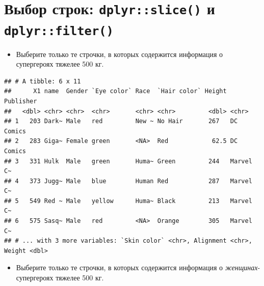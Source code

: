\documentclass[]{book}
\newenvironment{Shaded}{\begin{snugshade}}{\end{snugshade}}
\newcommand{\KeywordTok}[1]{\textcolor[rgb]{0.13,0.29,0.53}{\textbf{#1}}}
\newcommand{\DecValTok}[1]{\textcolor[rgb]{0.00,0.00,0.81}{#1}}
\newcommand{\StringTok}[1]{\textcolor[rgb]{0.31,0.60,0.02}{#1}}
\newcommand{\OperatorTok}[1]{\textcolor[rgb]{0.81,0.36,0.00}{\textbf{#1}}}
\newcommand{\NormalTok}[1]{#1}
\providecommand{\tightlist}{%
  \setlength{\itemsep}{0pt}\setlength{\parskip}{0pt}}
\begin{document}
\section{\texorpdfstring{Выбор строк: \texttt{dplyr::slice()} и
\texttt{dplyr::filter()}}{Выбор строк: dplyr::slice() и dplyr::filter()}}\label{solution_filt}

\begin{itemize}
\tightlist
\item
  Выберите только те строчки, в которых содержится информация о
  супергероях тяжелее 500 кг.
\end{itemize}

\begin{Shaded}
\end{Shaded}

\begin{verbatim}
## # A tibble: 6 x 11
##      X1 name  Gender `Eye color` Race  `Hair color` Height Publisher
##   <dbl> <chr> <chr>  <chr>       <chr> <chr>         <dbl> <chr>    
## 1   203 Dark~ Male   red         New ~ No Hair       267   DC Comics
## 2   283 Giga~ Female green       <NA>  Red            62.5 DC Comics
## 3   331 Hulk  Male   green       Huma~ Green         244   Marvel C~
## 4   373 Jugg~ Male   blue        Human Red           287   Marvel C~
## 5   549 Red ~ Male   yellow      Huma~ Black         213   Marvel C~
## 6   575 Sasq~ Male   red         <NA>  Orange        305   Marvel C~
## # ... with 3 more variables: `Skin color` <chr>, Alignment <chr>, Weight <dbl>
\end{verbatim}

\begin{itemize}
\tightlist
\item
  Выберите только те строчки, в которых содержится информация о
  \emph{женщинах}-супергероях тяжелее 500 кг.
\end{itemize}

\begin{Shaded}
\end{Shaded}
\end{document}

